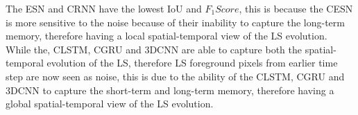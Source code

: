 \documentclass{WitsPhysicsReport}
\begin{document}
The ESN and CRNN have the lowest IoU and $F_{1}Score$, this is because the CESN is more sensitive to the noise because of their inability to capture the long-term memory, therefore having a local spatial-temporal view of the LS evolution. While the, CLSTM, CGRU and 3DCNN are able to capture both the spatial-temporal evolution of the LS, therefore LS foreground pixels from earlier time step are now seen as noise, this is due to the ability of the CLSTM, CGRU and 3DCNN to capture the short-term and long-term memory, therefore having a global spatial-temporal view of the LS evolution.





\end{document}
